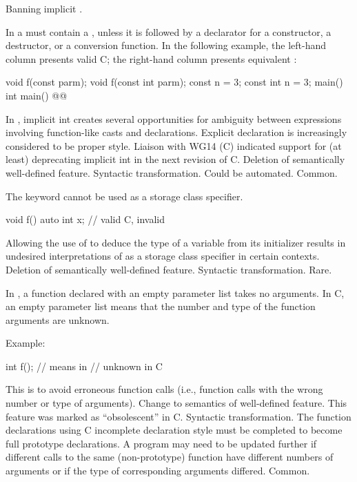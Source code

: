 \change
Banning implicit .

In \Cpp{} a
must contain a
, unless
it is followed by a declarator for a constructor, a destructor, or a
conversion function.
In the following example, the
left-hand column presents valid C;
the right-hand column presents
equivalent \Cpp{}:

\begin{codeblock}
void f(const parm);            void f(const int parm);
const n = 3;                   const int n = 3;
main()                         int main()
    @\commentellip@                      @\commentellip@
\end{codeblock}

\rationale
In \Cpp{}, implicit int creates several opportunities for
ambiguity between expressions involving function-like
casts and declarations.
Explicit declaration is increasingly considered
to be proper style.
Liaison with WG14 (C) indicated support for (at least)
deprecating implicit int in the next revision of C.
\effect
Deletion of semantically well-defined feature.
\difficulty
Syntactic transformation.
Could be automated.
\howwide
Common.

\change
The keyword  cannot be used as a storage class specifier.

\begin{codeblock}
void f() {
  auto int x;       // valid C, invalid \Cpp{}
}
\end{codeblock}

\rationale
Allowing the use of  to deduce the type
of a variable from its initializer results in undesired interpretations of
 as a storage class specifier in certain contexts.
\effect
Deletion of semantically well-defined feature.
\difficulty
Syntactic transformation.
\howwide
Rare.

\change
In \Cpp{}, a function declared with an empty parameter list takes no arguments.
In C, an empty parameter list means that the number and type of the function arguments are unknown.

Example:

\begin{codeblock}
int f();            // means    in \Cpp{}
                    //  unknown \tcode{)} in C
\end{codeblock}

\rationale
This is to avoid erroneous function calls (i.e., function calls
with the wrong number or type of arguments).
\effect
Change to semantics of well-defined feature.
This feature was marked as ``obsolescent'' in C.
\difficulty
Syntactic transformation.
The function declarations using C incomplete declaration style must
be completed to become full prototype declarations.
A program may need to be updated further if different calls to the
same (non-prototype) function have different numbers of arguments or
if the type of corresponding arguments differed.
\howwide
Common.

